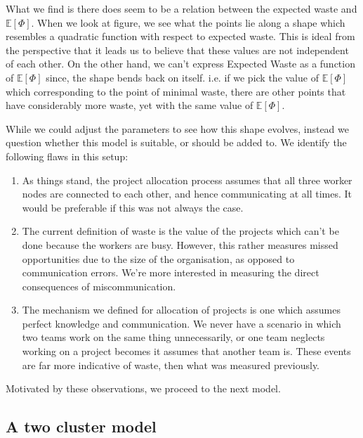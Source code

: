 What we find is there does seem to be a relation between the expected waste and $\mathbb{E}[\Phi]$. When we look at figure, we see what the points lie along a shape which resembles a quadratic function with respect to expected waste. This is ideal from the perspective that it leads us to believe that these values are not independent of each other. On the other hand, we can't express Expected Waste as a function of $\mathbb{E}[\Phi]$ since, the shape bends back on itself. i.e. if we pick the value of $\mathbb{E}[\Phi]$ which corresponding to the point of minimal waste, there are other points that have considerably more waste, yet with the same value of $\mathbb{E}[\Phi]$.

While we could adjust the parameters to see how this shape evolves, instead we question whether this model is suitable, or should be added to. We identify the following flaws in this setup:

\begin{enumerate}
	\item As things stand, the project allocation process assumes that all three worker nodes are connected to each other, and hence communicating at all times. It would be preferable if this was not always the case.
	
	\item The current definition of waste is the value of the projects which can't be done because the workers are busy. However, this rather measures missed opportunities due to the size of the organisation, as opposed to communication errors. We're more interested in measuring the direct consequences of miscommunication.
	
	\item The mechanism we defined for allocation of projects is one which assumes perfect knowledge and communication. We never have a scenario in which two teams work on the same thing unnecessarily, or one team neglects working on a project becomes it assumes that another team is. These events are far more indicative of waste, then what was measured previously. 

\end{enumerate}

Motivated by these observations, we proceed to the next model.



\subsection{A two cluster model}

